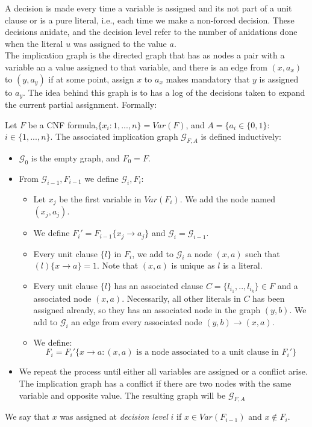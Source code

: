 A decision is made every time a variable is assigned and its not part of a unit clause or is a pure literal, i.e., each time we make a non-forced decision. These decisions anidate, and the decision level refer to the number of anidations done when the literal $u$ was assigned to the value $a$.\\

The implication graph  is the directed graph that has as nodes a pair with a variable an a value assigned to that variable, and there is an edge from $(x,a_x)$ to $(y,a_y)$ if at some point, assign $x$ to $a_x$  makes mandatory that $y$ is assigned to $a_y$.  The idea behind this graph is to has a log of the decisions taken to expand the current partial assignment. Formally:


\begin{definition}
  Let $F$ be a CNF formula,$\{x_i : 1,...,n\} = Var(F)$, and $A=\{ a_i\in \{0,1\}:$ $ i\in \{1,...,n\}$. The associated implication graph $\mathcal{G}_{F,A}$ is defined inductively:
  \begin{itemize}
  \item $\mathcal{G}_0$ is the empty graph, and $F_0 = F$.
  \item From $\mathcal{G}_{i-1}, F_{i-1}$ we define $\mathcal{G}_{i},F_i$:
    \begin{itemize}
  \item Let $x_j$ be the first variable in $Var(F_i)$. We add the node named $(x_j,a_j)$.
  \item We define $F_i' = F_{i-1}\{x_j\to a_j\}$ and $\mathcal{G}_{i}=\mathcal{G}_{i-1}$.
  \item Every unit clause $\{l\}$ in $F_{i}$, we add to $\mathcal{G}_{i}$ a node $(x,a)$ such that $(l)\{x\to a\} = 1$. Note that $(x,a)$ is unique as $l$ is a literal.

  \item Every unit clause $\{l\}$ has an associated clause $C=\{l_{i_1},..,l_{i_k}\}\in F$ and a associated node $(x,a)$. Necessarily, all other literals in $C$ has been assigned already, so they has an associated node in the graph $(y,b)$. We add to $\mathcal{G}_{i}$ an edge from every associated node $(y,b)\to (x,a)$.
  \item We define:
    $$F_i = F_i'\{x\to a : (x,a) \text{ is a node associated to a unit clause in } F_i' \}$$
  \end{itemize}
  \item We repeat the process until either all variables are assigned or a conflict arise. The implication graph has a conflict if there are two nodes with the same variable and opposite value. The resulting graph will be $\mathcal{G}_{F,A}$
  \end{itemize}
  We say that $x$ was assigned at \emph{decision level} $i$ if $x\in Var(F_{i-1})$ and $x \not\in F_i$. 
 \end{definition} 

